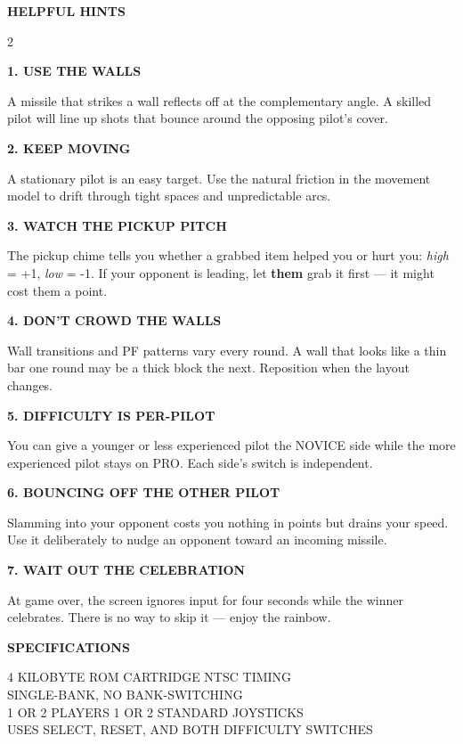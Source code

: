 \documentclass[10pt]{article}
\newcommand{\sectionrule}[1]{%
  \par\vspace{6pt}%
  \noindent\colorbox{atariOrange}{\parbox{\dimexpr\linewidth-2\fboxsep\relax}{\strut\textcolor{atariCream}{\textbf{\textsf{\MakeUppercase{#1}}}}\hfill}}%
  \par\vspace{4pt}%
}
\newcommand{\subhead}[1]{%
  \par\vspace{4pt}%
  \noindent\textbf{\textsf{\MakeUppercase{#1}}}\par\vspace{2pt}%
}
\begin{document}
\sectionrule{Helpful Hints}

\begin{multicols}{2}
\subhead{1. Use the Walls}
A missile that strikes a wall reflects off at the complementary angle.
A skilled pilot will line up shots that bounce around the opposing
pilot's cover.

\subhead{2. Keep Moving}
A stationary pilot is an easy target. Use the natural friction in the
movement model to drift through tight spaces and unpredictable arcs.

\subhead{3. Watch the Pickup Pitch}
The pickup chime tells you whether a grabbed item helped you or hurt
you: \textit{high} = +1, \textit{low} = -1. If your opponent is leading,
let \textbf{them} grab it first --- it might cost them a point.

\subhead{4. Don't Crowd the Walls}
Wall transitions and PF patterns vary every round. A wall that looks
like a thin bar one round may be a thick block the next. Reposition
when the layout changes.

\subhead{5. Difficulty Is Per-Pilot}
You can give a younger or less experienced pilot the {\sffamily NOVICE}
side while the more experienced pilot stays on {\sffamily PRO}. Each
side's switch is independent.

\subhead{6. Bouncing Off the Other Pilot}
Slamming into your opponent costs you nothing in points but drains your
speed. Use it deliberately to nudge an opponent toward an incoming
missile.

\subhead{7. Wait Out the Celebration}
At game over, the screen ignores input for four seconds while the
winner celebrates. There is no way to skip it --- enjoy the rainbow.
\end{multicols}

\newpage

\sectionrule{Specifications}

\begin{center}\sffamily\small
4 KILOBYTE ROM CARTRIDGE \textbullet{} NTSC TIMING\\
SINGLE-BANK, NO BANK-SWITCHING\\
1 OR 2 PLAYERS \textbullet{} 1 OR 2 STANDARD JOYSTICKS\\
USES SELECT, RESET, AND BOTH DIFFICULTY SWITCHES
\end{center}
\end{document}

